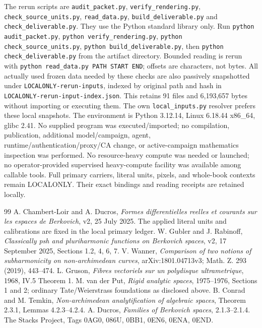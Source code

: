 The rerun scripts are \texttt{audit\_packet.py}, \texttt{verify\_rendering.py},
\texttt{check\_source\_units.py}, \texttt{read\_data.py},
\texttt{build\_deliverable.py} and
\texttt{check\_deliverable.py}. They use the Python standard library only.
Run \texttt{python audit\_packet.py}, \texttt{python verify\_rendering.py},
\texttt{python check\_source\_units.py},
\texttt{python build\_deliverable.py}, then
\texttt{python check\_deliverable.py} from the artifact directory.
Bounded reading is rerun with
\texttt{python read\_data.py PATH START END}; offsets are characters, not bytes.
All actually used frozen data needed by these checks are also passively
snapshotted under \texttt{LOCALONLY-rerun-inputs}, indexed by original path
and hash in \texttt{LOCALONLY-rerun-input-index.json}. This retains 91 files
and 6,193,657 bytes without importing or executing them. The own
\texttt{local\_inputs.py} resolver prefers these local snapshots.
The environment is Python 3.12.14, Linux 6.18.44 x86\_64, glibc 2.41.
No supplied program was executed/imported; no compilation, publication,
additional model/campaign, agent, runtime/authentication/proxy/CA change, or
active-campaign mathematics inspection was performed.
No resource-heavy compute was needed or launched; no operator-provided
supervised heavy-compute facility was available among callable tools.
Full primary carriers, literal units, pixels, and whole-book contexts remain
LOCALONLY. Their exact bindings and reading receipts are retained locally.

\begin{thebibliography}{99}
 A. Chambert-Loir and A. Ducros, \emph{Formes differentielles reelles
et courants sur les espaces de Berkovich}, v2, 25 July 2025. The applied literal
units and calibrations are fixed in the local primary ledger.
 W. Gubler and J. Rabinoff, \emph{Classically psh and pluriharmonic
functions on Berkovich spaces}, v2, 17 September 2025, Sections 1.2, 4, 6, 7.
 V. Wanner, \emph{Comparison of two notions of subharmonicity on
non-archimedean curves}, arXiv:1801.04713v3; Math. Z. 293 (2019), 443--474.
 L. Gruson, \emph{Fibres vectoriels sur un polydisque ultrametrique},
1968, IV.5 Theorem 1.
 M. van der Put, \emph{Rigid analytic spaces}, 1975--1976,
Sections 1 and 2; ordinary Tate/Weierstrass foundations as disclosed above.
 B. Conrad and M. Temkin, \emph{Non-archimedean analytification of
algebraic spaces}, Theorem 2.3.1, Lemmas 4.2.3--4.2.4.
 A. Ducros, \emph{Families of Berkovich spaces}, 2.1.3--2.1.4.
 The Stacks Project, Tags 0AG0, 086U, 0BB1, 0EN6, 0ENA, 0END.
\end{thebibliography}

